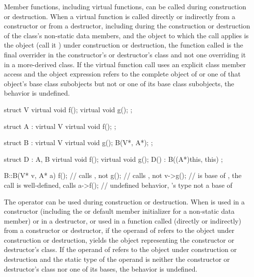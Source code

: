 \pnum
{}%
%
%
%
Member functions, including virtual functions, can be called
during construction or destruction.
When a virtual function is called directly or indirectly from a constructor
or from a destructor,
including during the construction or destruction of the class's non-static data
members,
and the object to which the call applies is the object (call it ) under construction or
destruction,
the function called is the
final overrider in the constructor's or destructor's class and not one
overriding it in a more-derived class.
If the virtual function call uses an explicit class member access
and the object expression refers to
the complete object of  or one of that object's base class subobjects
but not  or one of its base class subobjects, the behavior
is undefined.
\begin{example}
\begin{codeblock}
struct V {
  virtual void f();
  virtual void g();
};

struct A : virtual V {
  virtual void f();
};

struct B : virtual V {
  virtual void g();
  B(V*, A*);
};

struct D : A, B {
  virtual void f();
  virtual void g();
  D() : B((A*)this, this) { }
};

B::B(V* v, A* a) {
  f();              // calls , not 
  g();              // calls , not 
  v->g();           //  is base of , the call is well-defined, calls 
  a->f();           // undefined behavior, 's type not a base of 
}
\end{codeblock}
\end{example}

\pnum
{}%
%
%
%
The
operator can be used during construction or destruction.
When
is used in a constructor (including the
 or default member initializer
for a non-static data member)
or in a destructor, or used in a function called (directly or indirectly) from
a constructor or destructor, if the operand of
refers to the object under construction or destruction,
yields the
object representing the constructor or destructor's class.
If the operand of
refers to the object under construction or destruction and the static type of
the operand is neither the constructor or destructor's class nor one of its
bases, the behavior is undefined.

